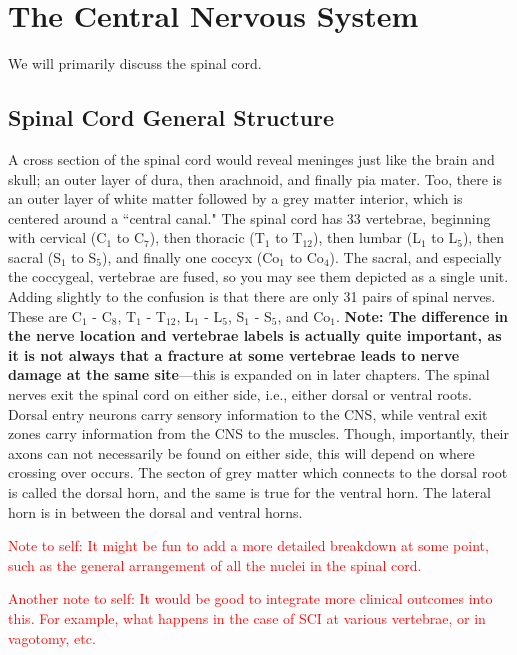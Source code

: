 \documentclass[12pt]{report}
\begin{document}
\chapter{The Central Nervous System}

We will primarily discuss the spinal cord. 

\section{Spinal Cord General Structure}
A cross section of the spinal cord would reveal meninges just like the brain and skull; an outer layer of dura, then arachnoid, and finally pia mater. Too, there is an outer layer of white matter followed by a grey matter interior, which is centered around a ``central canal." The spinal cord has 33 vertebrae, beginning with cervical (C$_1$ to C$_7$), then thoracic (T$_1$ to T$_{12}$), then lumbar (L$_1$ to L$_5$), then sacral (S$_1$ to S$_5$), and finally one coccyx (Co$_1$ to Co$_4$). The sacral, and especially the coccygeal, vertebrae are fused, so you may see them depicted as a single unit. Adding slightly to the confusion is that there are only 31 pairs of spinal nerves. These are C$_1$ - C$_8$, T$_1$ - T$_{12}$, L$_1$ - L$_5$, S$_1$ - S$_5$, and Co$_1$. \textbf{Note: The difference in the nerve location and vertebrae labels is actually quite important, as it is not always that a fracture at some vertebrae leads to nerve damage at the same site}---this is expanded on in later chapters. The spinal nerves exit the spinal cord on either side, i.e., either dorsal or ventral roots. Dorsal entry neurons carry sensory information to the CNS, while ventral exit zones carry information from the CNS to the muscles. Though, importantly, their axons can not necessarily be found on either side, this will depend on where crossing over occurs. The secton of grey matter which connects to the dorsal root is called the dorsal horn, and the same is true for the ventral horn. The lateral horn is in between the dorsal and ventral horns.\newline

\textcolor{red}{Note to self: It might be fun to add a more detailed breakdown at some point, such as the general arrangement of all the nuclei in the spinal cord.}\newline

\textcolor{red}{Another note to self: It would be good to integrate more clinical outcomes into this. For example, what happens in the case of SCI at various vertebrae, or in vagotomy, etc.}
\end{document}
